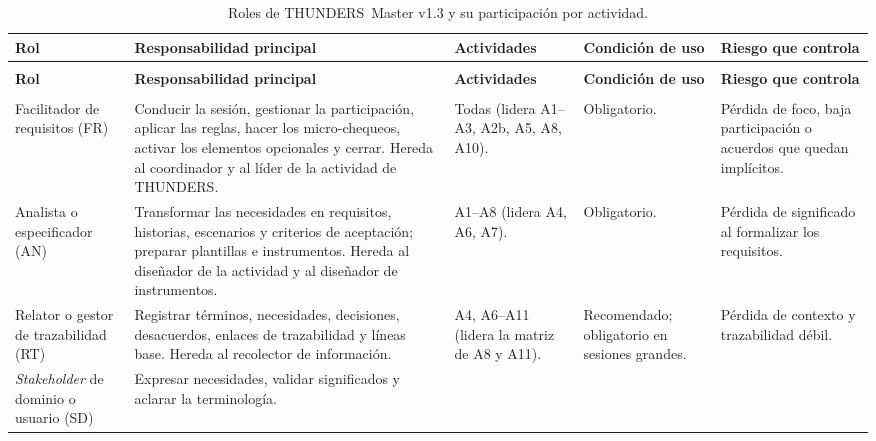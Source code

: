 \documentclass[12pt,letterpaper,oneside]{report}
\begin{document}
{\footnotesize
\setlength{\tabcolsep}{3.5pt}
\renewcommand{\arraystretch}{1.1}
\begin{xltabular}{\textwidth}{@{}>{\raggedright\arraybackslash}p{0.16\textwidth}
                                >{\raggedright\arraybackslash}X
                                >{\raggedright\arraybackslash}p{0.14\textwidth}
                                >{\raggedright\arraybackslash}p{0.14\textwidth}
                                >{\raggedright\arraybackslash}p{0.18\textwidth}@{}}
\caption{Roles de THUNDERS~Master v1.3 y su participación por actividad.\label{tab:roles}}\\
\toprule
\textbf{Rol} & \textbf{Responsabilidad principal} & \textbf{Actividades} &
\textbf{Condición de uso} & \textbf{Riesgo que controla} \\
\midrule
\endfirsthead
{}\\
\toprule
\textbf{Rol} & \textbf{Responsabilidad principal} & \textbf{Actividades} &
\textbf{Condición de uso} & \textbf{Riesgo que controla} \\
\midrule
\endhead
\midrule
{}\\
\endfoot
\bottomrule
\endlastfoot
Facilitador de requisitos (FR)
& Conducir la sesión, gestionar la participación, aplicar las reglas, hacer los
  micro-chequeos, activar los elementos opcionales y cerrar. Hereda al
  coordinador y al líder de la actividad de THUNDERS.
& Todas (lidera A1--A3, A2b, A5, A8, A10).
& Obligatorio.
& Pérdida de foco, baja participación o acuerdos que quedan implícitos. \\
\addlinespace
Analista o especificador (AN)
& Transformar las necesidades en requisitos, historias, escenarios y criterios
  de aceptación; preparar plantillas e instrumentos. Hereda al diseñador de la
  actividad y al diseñador de instrumentos.
& A1--A8 (lidera A4, A6, A7).
& Obligatorio.
& Pérdida de significado al formalizar los requisitos. \\
\addlinespace
Relator o gestor de trazabilidad (RT)
& Registrar términos, necesidades, decisiones, desacuerdos, enlaces de
  trazabilidad y líneas base. Hereda al recolector de información.
& A4, A6--A11 (lidera la matriz de A8 y A11).
& Recomendado; obligatorio en sesiones grandes.
& Pérdida de contexto y trazabilidad débil. \\
\addlinespace
\textit{Stakeholder} de dominio o usuario (SD)
& Expresar necesidades, validar significados y aclarar la terminología.

\end{xltabular}}
\end{document}
